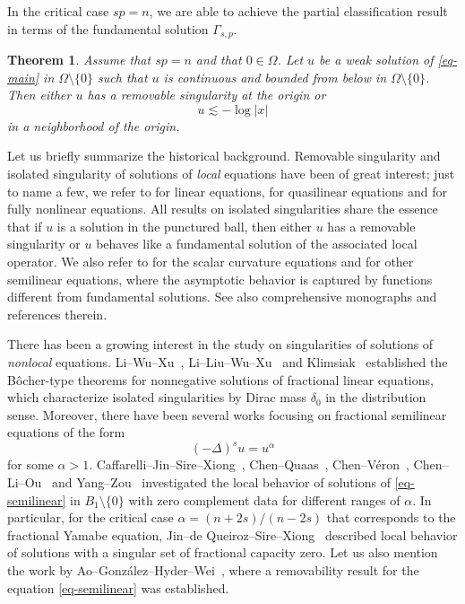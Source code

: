 \documentclass[11pt]{amsart}
\theoremstyle{plain}
\newtheorem{theorem}{Theorem}[section]
\theoremstyle{definition}
\numberwithin{equation}{section}
\begin{document}
	In the critical case $sp=n$, we are able to achieve the partial classification result in terms of the fundamental solution $\Gamma_{s, p}$.
	
	\begin{theorem}\label{thm-iso-log}
		Assume that $sp=n$ and that $0 \in \Omega$. Let $u$ be a weak solution of \eqref{eq-main} in $\Omega \setminus \{0\}$ such that $u$ is continuous and bounded from below in $\Omega \setminus \{0\}$. Then either $u$ has a removable singularity at the origin or
		\begin{equation*}
			u \lesssim -\log |x|
		\end{equation*}
		in a neighborhood of the origin.
	\end{theorem}

	Let us briefly summarize the historical background. Removable singularity and isolated singularity of solutions of \textit{local} equations have been of great interest; just to name a few, we refer to \cite{Boc03, Car67, GS55} for linear equations, \cite{NSS03, Ser64, Ser65} for quasilinear equations and \cite{ASS11, Lab00, Lab01} for fully nonlinear equations. All results on isolated singularities share the essence that if $u$ is a solution in the punctured ball, then either $u$ has a removable singularity or $u$ behaves like a fundamental solution of the associated local operator. We also refer to \cite{CGS89, CL99, KMPS99} for the scalar curvature equations and \cite{Avi83, BVGHV19, BVV91, GS81, Lio80} for other semilinear equations, where the asymptotic behavior is captured by functions different from fundamental solutions. See also comprehensive monographs \cite{QS19, Ver96} and references therein. 

    There has been a growing interest in the study on singularities of solutions of \emph{nonlocal} equations. Li--Wu--Xu~\cite{LWX18}, Li--Liu--Wu--Xu~\cite{LLWX20} and Klimsiak~\cite{Kli25} established the B\^ocher-type theorems for nonnegative solutions of fractional linear equations, which characterize isolated singularities by Dirac mass $\delta_0$ in the distribution sense. Moreover, there have been several works focusing on fractional semilinear equations of the form
    \begin{equation}\label{eq-semilinear}
        (-\Delta)^s u = u^\alpha
    \end{equation}
    for some $\alpha>1$. Caffarelli--Jin--Sire--Xiong~\cite{CJSX14}, Chen--Quaas~\cite{CQ18}, Chen--V\'eron~\cite{CV23}, Chen--Li--Ou~\cite{CLO05} and Yang--Zou~\cite{YZ19,YZ21} investigated the local behavior of solutions of \eqref{eq-semilinear} in $B_1 \setminus \{0\}$ with zero complement data for different ranges of $\alpha$. In particular, for the critical case $\alpha=(n+2s)/(n-2s)$ that corresponds to the fractional Yamabe equation, Jin--de Queiroz--Sire--Xiong~\cite{JdQSX17} described local behavior of solutions with a singular set of fractional capacity zero. Let us also mention the work by Ao--Gonz\'alez--Hyder--Wei~\cite{AGHW22}, where a removability result for the equation \eqref{eq-semilinear} was established. 
    
\end{document}
